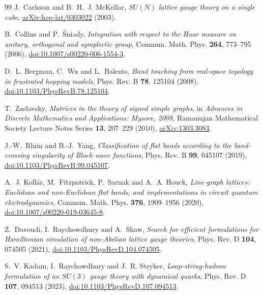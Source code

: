 \documentclass[11pt]{article}
\theoremstyle{plain}
\theoremstyle{definition}
\theoremstyle{remark}
\begin{document}
\begin{thebibliography}{99}
 J.~Carlsson and B.~H.~J. McKellar,
  \emph{$SU(N)$ lattice gauge theory on a single cube},
  \href{https://arxiv.org/abs/hep-lat/0303022}{arXiv:hep-lat/0303022} (2003).

 B.~Collins and P.~\'Sniady,
  \emph{Integration with respect to the Haar measure on unitary, orthogonal
  and symplectic group}, Commun. Math. Phys. \textbf{264}, 773--795 (2006),
  \href{https://doi.org/10.1007/s00220-006-1554-3}{doi:10.1007/s00220-006-1554-3}.

 D.~L. Bergman, C.~Wu and L.~Balents,
  \emph{Band touching from real-space topology in frustrated hopping models},
  Phys. Rev. B \textbf{78}, 125104 (2008),
  \href{https://doi.org/10.1103/PhysRevB.78.125104}{doi:10.1103/PhysRevB.78.125104}.

 T.~Zaslavsky,
  \emph{Matrices in the theory of signed simple graphs}, in
  \emph{Advances in Discrete Mathematics and Applications: Mysore, 2008},
  Ramanujan Mathematical Society Lecture Notes Series \textbf{13}, 207--229
  (2010), \href{https://arxiv.org/abs/1303.3083}{arXiv:1303.3083}.

 J.-W.~Rhim and B.-J.~Yang,
  \emph{Classification of flat bands according to the band-crossing
  singularity of Bloch wave functions}, Phys. Rev. B \textbf{99}, 045107
  (2019), \href{https://doi.org/10.1103/PhysRevB.99.045107}{doi:10.1103/PhysRevB.99.045107}.

 A.~J. Koll\'ar, M.~Fitzpatrick, P.~Sarnak and A.~A. Houck,
  \emph{Line-graph lattices: Euclidean and non-Euclidean flat bands, and
  implementations in circuit quantum electrodynamics}, Commun. Math. Phys.
  \textbf{376}, 1909--1956 (2020),
  \href{https://doi.org/10.1007/s00220-019-03645-8}{doi:10.1007/s00220-019-03645-8}.

 Z.~Davoudi, I.~Raychowdhury and A.~Shaw,
  \emph{Search for efficient formulations for Hamiltonian simulation of
  non-Abelian lattice gauge theories}, Phys. Rev. D \textbf{104}, 074505
  (2021), \href{https://doi.org/10.1103/PhysRevD.104.074505}{doi:10.1103/PhysRevD.104.074505}.

 S.~V. Kadam, I.~Raychowdhury and J.~R. Stryker,
  \emph{Loop-string-hadron formulation of an $SU(3)$ gauge theory with
  dynamical quarks}, Phys. Rev. D \textbf{107}, 094513 (2023),
  \href{https://doi.org/10.1103/PhysRevD.107.094513}{doi:10.1103/PhysRevD.107.094513}.


\end{thebibliography}
\end{document}
